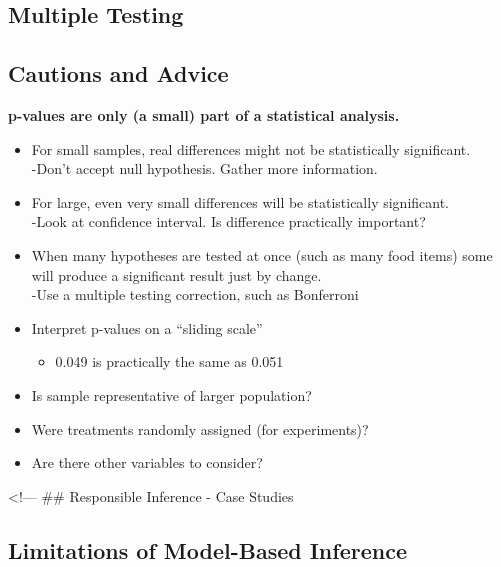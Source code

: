 \documentclass[
  letterpaper,
  DIV=11,
  numbers=noendperiod]{scrreprt}
\providecommand{\tightlist}{%
  \setlength{\itemsep}{0pt}\setlength{\parskip}{0pt}}\usepackage{longtable,booktabs,array}
\begin{document}
\subsection{Multiple Testing}\label{multiple-testing}

\subsection{Cautions and Advice}\label{cautions-and-advice}

\textbf{p-values are only (a small) part of a statistical analysis.}

\begin{itemize}
\tightlist
\item
  For small samples, real differences might not be statistically
  significant.\\
  -Don't accept null hypothesis. Gather more information.\\
\item
  For large, even very small differences will be statistically
  significant.\\
  -Look at confidence interval. Is difference practically important?\\
\item
  When many hypotheses are tested at once (such as many food items) some
  will produce a significant result just by change.\\
  -Use a multiple testing correction, such as Bonferroni\\
\item
  Interpret p-values on a ``sliding scale''

  \begin{itemize}
  \tightlist
  \item
    0.049 is practically the same as 0.051
  \end{itemize}
\item
  Is sample representative of larger population?\\
\item
  Were treatments randomly assigned (for experiments)?\\
\item
  Are there other variables to consider?
\end{itemize}

\textless!--- \#\# Responsible Inference - Case Studies

\subsection{Limitations of Model-Based
Inference}\label{limitations-of-model-based-inference}
\end{document}
